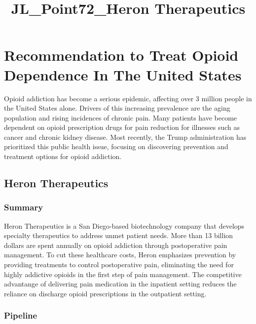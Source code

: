 \documentclass[11pt]{article}
\title{JL\_Point72\_Heron Therapeutics}
\begin{document}
    
    
    \maketitle
    
    

    
    \section{Recommendation to Treat Opioid Dependence In The United
States}\label{recommendation-to-treat-opioid-dependence-in-the-united-states}

Opioid addiction has become a serious epidemic, affecting over 3 million
people in the United States alone. Drivers of this increasing prevalence
are the aging population and rising incidences of chronic pain. Many
patients have become dependent on opioid prescription drugs for pain
reduction for illnesses such as cancer and chronic kidney disease. Most
recently, the Trump administration has prioritized this public health
issue, focusing on discovering prevention and treatment options for
opioid addiction.

    \subsection{Heron Therapeutics}\label{heron-therapeutics}

\subsubsection{Summary}\label{summary}

Heron Therapeutics is a San Diego-based biotechnology company that
develops specialty therapeutics to address unmet patient needs. More
than 13 billion dollars are spent annually on opioid addiction through
postoperative pain management. To cut these healthcare costs, Heron
emphasizes prevention by providing treatments to control postoperative
pain, eliminating the need for highly addictive opioids in the first
step of pain management. The competitive advantange of delivering pain
medication in the inpatient setting reduces the reliance on discharge
opioid prescriptions in the outpatient setting.

\subsubsection{Pipeline}\label{pipeline}
\end{document}
